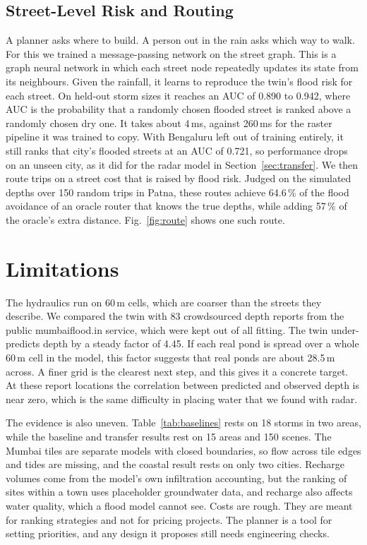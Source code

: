 \documentclass[conference]{IEEEtran}
\begin{document}
\subsection{Street-Level Risk and Routing}
A planner asks where to build. A person out in the rain asks which way to walk. For this we trained a
message-passing network on the street graph. This is a graph neural network in which each street
node repeatedly updates its state from its neighbours. Given the rainfall, it learns to reproduce
the twin's flood risk for each street. On held-out storm sizes it reaches an AUC of 0.890 to 0.942,
where AUC is the probability that a randomly chosen flooded street is ranked above a randomly chosen
dry one. It takes about 4\,ms, against 260\,ms for the raster pipeline it was trained to copy. With
Bengaluru left out of training entirely, it still ranks that city's flooded streets at an AUC of
0.721, so performance drops on an unseen city, as it did for the radar model in
Section~\ref{sec:transfer}. We then route trips on a street cost that is raised by flood risk.
Judged on the simulated depths over 150 random trips in Patna, these routes achieve 64.6\,\% of the
flood avoidance of an oracle router that knows the true depths, while adding 57\,\% of the oracle's
extra distance. Fig.~\ref{fig:route} shows one such route.

\section{Limitations}
\label{sec:limits}
The hydraulics run on 60\,m cells, which are coarser than the streets they describe. We compared the
twin with 83 crowdsourced depth reports from the public mumbaiflood.in service, which were kept out
of all fitting. The twin under-predicts depth by a steady factor of 4.45. If each real pond is
spread over a whole 60\,m cell in the model, this factor suggests that real ponds are about 28.5\,m
across. A finer grid is the clearest next step, and this gives it a concrete target. At these report
locations the correlation between predicted and observed depth is near zero, which is the same
difficulty in placing water that we found with radar.

The evidence is also uneven. Table~\ref{tab:baselines} rests on 18 storms in two areas, while the
baseline and transfer results rest on 15 areas and 150 scenes. The Mumbai tiles are separate models
with closed boundaries, so flow across tile edges and tides are missing, and the coastal result
rests on only two cities. Recharge volumes come from the model's own infiltration accounting, but
the ranking of sites within a town uses placeholder groundwater data, and recharge also affects
water quality, which a flood model cannot see. Costs are rough. They are meant for ranking
strategies and not for pricing projects. The planner is a tool for setting priorities, and any
design it proposes still needs engineering checks.
\end{document}
